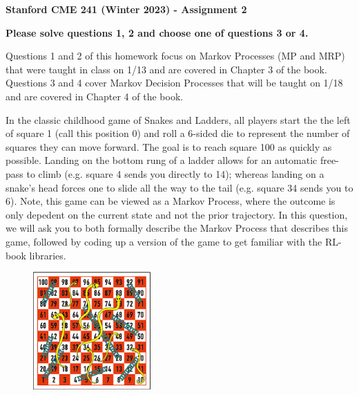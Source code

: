 \documentclass[12pt]{exam}
\begin{document}
\begin{center}
{\large {\bf Stanford CME 241 (Winter 2023) - Assignment 2}}
\end{center}
 

\noindent \textbf{Please solve questions 1, 2 and choose one of questions 3 or 4. }

\noindent Questions 1 and 2 of this homework focus on Markov Processes (MP and MRP) that were taught in class on 1/13 and are covered in Chapter 3 of the book. Questions 3 and 4 cover Markov Decision Processes that will be taught on 1/18 and are covered in Chapter 4 of the book.

\begin{questions}
\question In the classic childhood game of Snakes and Ladders, all players start the the left of square 1 (call this position 0) and roll a 6-sided die to represent the number of squares they can move forward. The goal is to reach square 100 as quickly as possible. Landing on the bottom rung of a ladder allows for an automatic free-pass to climb (e.g. square 4 sends you directly to 14); whereas landing on a snake's head forces one to slide all the way to the tail (e.g. square 34 sends you to 6). Note, this game can be viewed as a Markov Process, where the outcome is only depedent on the current state and not the prior trajectory. In this question, we will ask you to both formally describe the Markov Process that describes this game, followed by coding up a version of the game to get familiar with the RL-book libraries.

\begin{figure}[h]
	\begin{center}
	\includegraphics[width=0.4\textwidth]{Figures/2_snakes_and_ladders.png}
	\end{center}
\end{figure}


\end{questions}
\end{document}
